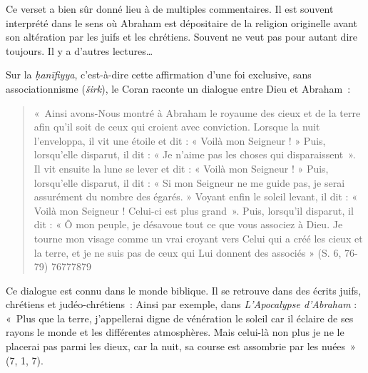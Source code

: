 Ce verset a bien sûr donné lieu à de multiples commentaires. Il est
souvent interprété dans le sens où Abraham est dépositaire de la
religion originelle avant son altération par les juifs et les chrétiens.
Souvent ne veut pas pour autant dire toujours. Il y a d'autres
lectures\ldots{}

Sur la \emph{ḥanīfiyya}, c'est-à-dire cette affirmation d'une foi
exclusive, sans associationnisme (\emph{širk}), le Coran raconte un
dialogue entre Dieu et Abraham\emph{~}:

\begin{quote}
    «~Ainsi avons-Nous montré à Abraham le royaume des cieux et de la terre
afin qu'il soit de ceux qui croient avec conviction. Lorsque la nuit
l'enveloppa, il vit une étoile et dit : « Voilà mon Seigneur ! » Puis,
lorsqu'elle disparut, il dit : « Je n'aime pas les choses qui
disparaissent~». Il vit ensuite la lune se lever et dit : « Voilà mon
Seigneur ! » Puis, lorsqu'elle disparut, il dit : « Si mon Seigneur ne
me guide pas, je serai assurément du nombre des égarés. » Voyant enfin
le soleil levant, il dit : « Voilà mon Seigneur ! Celui-ci est plus
grand~». Puis, lorsqu'il disparut, il dit : « Ô mon peuple, je désavoue
tout ce que vous associez à Dieu. Je tourne mon visage comme un vrai
croyant vers Celui qui a créé les cieux et la terre, et je ne suis pas
de ceux qui Lui donnent des associés » (S. 6, 76-79)  76777879 \\

\end{quote}
Ce dialogue est connu dans le monde biblique. Il se retrouve dans des
écrits juifs, chrétiens et judéo-chrétiens~: Ainsi par exemple, dans
\emph{L'Apocalypse d'Abraham} : «~Plus que la terre, j'appellerai digne de
vénération le soleil car il éclaire de ses rayons le monde et les
différentes atmosphères. Mais celui-là non plus je ne le placerai pas
parmi les dieux, car la nuit, sa course est assombrie par les nuées~»
(7, 1, 7).

